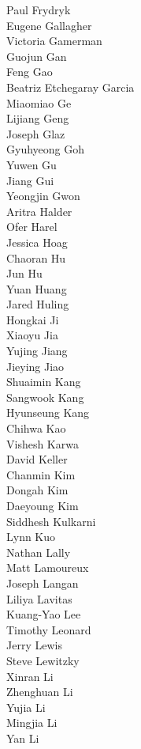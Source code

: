Paul Frydryk\\
Eugene Gallagher\\
Victoria Gamerman\\
Guojun  Gan\\
Feng Gao\\
Beatriz Etchegaray Garcia\\
Miaomiao Ge\\
Lijiang Geng\\
Joseph Glaz\\
Gyuhyeong Goh\\
Yuwen Gu\\
Jiang Gui\\
Yeongjin Gwon\\
Aritra Halder\\
Ofer Harel\\
Jessica Hoag\\
Chaoran Hu\\
Jun Hu\\
Yuan Huang\\
Jared Huling\\
Hongkai Ji\\
Xiaoyu Jia\\
Yujing Jiang\\
Jieying Jiao\\
Shuaimin Kang\\
Sangwook Kang\\
Hyunseung Kang\\
Chihwa Kao\\
Vishesh Karwa\\
David Keller\\
Chanmin Kim\\
Dongah Kim\\
Daeyoung Kim\\
Siddhesh Kulkarni\\
Lynn Kuo\\
Nathan Lally\\
Matt Lamoureux\\
Joseph Langan\\
Liliya Lavitas\\
Kuang-Yao Lee\\
Timothy Leonard\\
Jerry Lewis\\
Steve Lewitzky\\
Xinran Li\\
Zhenghuan Li\\
Yujia Li\\
Mingjia Li\\
Yan Li\\
